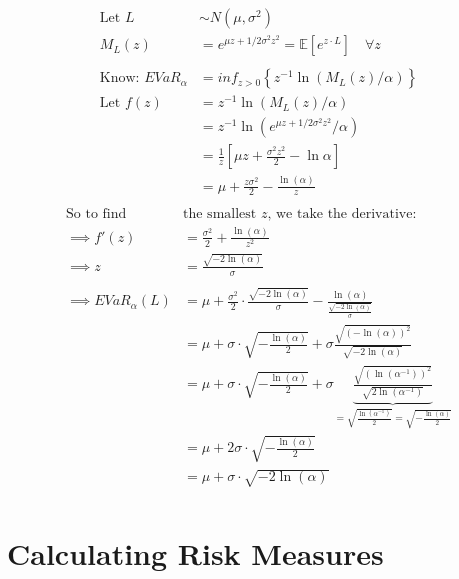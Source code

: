 \documentclass[
  oneside]{book}
\begin{document}
\[
\begin{aligned}
\text{Let } L &\sim N(\mu, \sigma^{2})\\
M_{L}(z) &= e^{\mu z+1/2 \sigma^{2}z^{2}} = \mathbb{E}[e^{z\cdot L}]\quad \forall z\\
\\
\text{Know: }EVaR_{\alpha} &= inf_{z>0} \left\{ z^{-1} \ln(M_{L}(z) / \alpha) \right\}\\
\text{Let } f(z) &= z^{-1} \ln(M_{L}(z) / \alpha)\\
&= z^{-1} \ln(e^{\mu z+1/2 \sigma^{2}z^{2}} / \alpha)\\
&= \frac{1}{z}\left[ \mu z+\frac{\sigma^{2}z^{2}}{2}-\ln \alpha \right]\\
&= \mu + \frac{z\sigma^{2}}{2} - \frac{\ln(\alpha)}{z}\\
\end{aligned}
\]
\[
\begin{aligned}
\text{So to find }& \text{the smallest $z$, we take the derivative:}\\
\implies f'(z) &= \frac{\sigma^{2}}{2}+\frac{\ln(\alpha)}{z^{2}}\\
\implies z &= \frac{\sqrt{-2\ln(\alpha)}}{\sigma}\\
\\
\implies EVaR_{\alpha}(L) &= \mu + \frac{\sigma^{2}}{2}\cdot \frac{\sqrt{-2\ln(\alpha)}}{\sigma} - \frac{\ln(\alpha)}{\frac{\sqrt{-2\ln(\alpha)}}{\sigma}}\\
&= \mu + \sigma \cdot \sqrt{-\frac{\ln(\alpha)}{2}} + \sigma \frac{\sqrt{(-\ln(\alpha))^{2} }}{\sqrt{-2\ln(\alpha)}}\\
&= \mu + \sigma \cdot \sqrt{-\frac{\ln(\alpha)}{2}} + \sigma \underbrace{ \frac{\sqrt{(\ln(\alpha ^{-1}))^{2} }}{\sqrt{2\ln(\alpha ^{-1})}} }_{= \sqrt{ \frac{\ln(\alpha ^{-1})}{2} }  = \sqrt{ -\frac{\ln(\alpha)}{2} }}\\
&= \mu + 2\sigma \cdot \sqrt{-\frac{\ln(\alpha)}{2}}\\
&= \mu + \sigma \cdot \sqrt{-2\ln(\alpha)}\\
\end{aligned}
\]

\hypertarget{calculating-risk-measures}{%
\section{Calculating Risk Measures}\label{calculating-risk-measures}}
\end{document}
